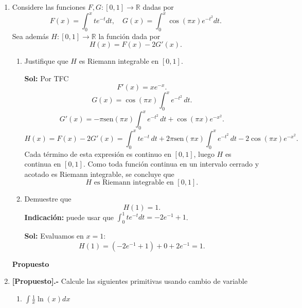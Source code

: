 \documentclass[letterpaper,12pt]{article}
\theoremstyle{plain}
\theoremstyle{definition}
\newcommand{\sen}{\text{sen}}
\begin{document}
\begin{enumerate}
\begin{enumerate}
    \color{black}
    \item Concluya que $f(x) = e^{x+c}$.

    \color{blue}
    \textbf{Sol:} De lo anterior tenemos
\[
\int \frac{f'(x)}{f(x)}\,dx=x+c.
\]
Haciendo un cambio de variable $f(x)=u \rightarrow f'(x)dx=du$, entonces
\[
\int \frac{f'(x)}{f(x)}\,dx=\int\frac{du}{u}=\ln(u)=\ln f(x)
\]
por lo tanto
\[
\ln f(x)=x+c.
\]
Exponenciando ambos lados
\[
f(x)=e^{x+c}
\]


    \color{black}
\end{enumerate}

\item Considere las funciones $F, G : [0, 1] \to \mathbb{R}$ dadas por
    \[
    F(x) = \int_0^x t e^{-t} dt, \quad G(x) = \int_0^x \cos(\pi x) e^{-t^2} dt.
    \]
    Sea además $H : [0, 1] \to \mathbb{R}$ la función dada por
    \[
    H(x) = F(x) - 2G'(x).
    \]
    \begin{enumerate}
        \item Justifique que $H$ es Riemann integrable en $[0, 1]$.

        \color{blue}
    \textbf{Sol:} Por TFC
\[
F'(x)=x e^{-x}.
\]
\[
G(x)=\cos(\pi x)\int_0^x e^{-t^2}\,dt.
\]
\[
G'(x)
=-\pi\sen(\pi x)\int_0^x e^{-t^2}\,dt
+\cos(\pi x)e^{-x^2}.
\]
\[
H(x)=F(x)-2G'(x)
=\int_0^x t e^{-t}\,dt
+2\pi\sen(\pi x)\int_0^x e^{-t^2}\,dt
-2\cos(\pi x)e^{-x^2}.
\]
Cada término de esta expresión es continuo en $[0,1]$, luego $H$ es continua en $[0,1]$. Como toda función continua en un intervalo cerrado y acotado es Riemann integrable, se concluye que
\[
H \text{ es Riemann integrable en } [0,1].
\]

    \color{black}
        
        \item Demuestre que
        \[
        H(1) = 1.
        \]
        \textbf{Indicación:} puede usar que $\displaystyle \int_0^1 t e^{-t} dt = -2e^{-1} + 1$.

        \color{blue}
    \textbf{Sol:} Evaluamos en $x=1$:
\[
H(1) = (-2 e^{-1} + 1) + 0 + 2 e^{-1} = 1.
\]

    \color{black}
    \end{enumerate}


\color{blue}
    \textbf{Propuesto}
\color{black}

\item \textbf{[Propuesto].-} Calcule las siguientes primitivas usando cambio de variable

    
\begin{enumerate}
    \item $\displaystyle \int \frac{1}{x} \ln(x) dx$


\end{enumerate}
\end{enumerate}
\end{document}
